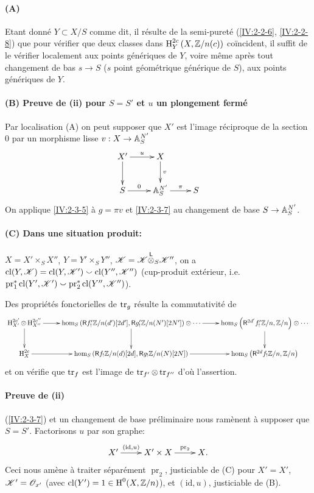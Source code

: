 
\paragraph{(A)}
Etant donné $Y\subset X/S$ comme dit, il résulte de la semi-pureté 
(\ref{IV:2-2-6}, \ref{IV:2-2-8}) que pour vérifier que deux classes dans 
$\operatorname{H}_Y^{2 c}\left(X,\mathbb{Z}/n(c)\right)$ coïncident, il suffit de le vérifier 
localement aux points génériques de $Y$, voire même après tout 
changement de bas $s\to S$ ($s$ point géométrique générique de $S$), 
aux points génériques de $Y$. 

\paragraph{(B) Preuve de (ii) pour $S=S'$ et $u$ un plongement fermé}
Par localisation (A) on peut supposer que $X'$ est l'image 
réciproque de la section $0$ par un morphisme lisse $v:X\to \mathbb{A}_S^{N'}$ 
\[\xymatrix{
  X' \ar[r]^-u \ar[d] 
    & X \ar[d]^-v \\
  S \ar[r]^-0 
    & \dA_S^{N'} \ar[r]^-\pi 
    & S
}\]
On applique \ref{IV:2-3-5} à $g=\pi v$ et \ref{IV:2-3-7} au changement de 
base $S\to \mathbb{A}_S^{N'}$. 

\paragraph{(C) Dans une situation produit:}
$X=X'\times_S X''$, $Y=Y'\times_S Y''$, $\mathscr{K}=\mathscr{K}{\overset{\mathsf{L}}{\otimes}}_S \mathscr{K}''$, on a 
$\operatorname{cl}(Y,\mathscr{K}) = \operatorname{cl}(Y,\mathscr{K}')\smallsmile \operatorname{cl}(Y'',\mathscr{K}'')$ (cup-produit extérieur, 
i.e. $\operatorname{pr}_1^\ast \operatorname{cl}(Y',\mathscr{K}')\smallsmile \operatorname{pr}_2^\ast \operatorname{cl}(Y'',\mathscr{K}'')$). 

Des propriétés fonctorielles de $\operatorname{tr}_g$ \cite[XVIII.2.12]{sga4} résulte 
la commutativité de 
\[\xymatrix{
  \h_{X'}^{2c'}\otimes \h_{X''}^{2 c''}\ar[r] \ar[d] 
    & \hom_S\left(\R f_!' \dZ/n(d')[2 d'],\R g_!'\dZ/n(N')[2 N']\right)\otimes \cdots \ar[r] \ar[d] 
    & \hom_S\left(\R^{2 d'} f_!' \dZ/n,\dZ/n\right) \otimes \cdots \ar[d] \\
  \h_X^{2 c} \ar[r] 
    & \hom_S\left(\R f_!\dZ/n(d)[2 d],\R g_!\dZ/n(N)[2 N]\right) \ar[r] 
    & \hom_S\left(\R ^{2 d}f_!\dZ/n,\dZ/n\right)
}\]
et on vérifie que $\operatorname{tr}_f$ est l'image de $\operatorname{tr}_{f'}\otimes \operatorname{tr}_{f''}$ d'où 
l'assertion. 

\paragraph{Preuve de (ii)}
(\ref{IV:2-3-7}) et un changement de base préliminaire nous ramènent à 
supposer que $S=S'$. Factorisons $u$ par son graphe:
\[\xymatrix{
  X' \ar[r]^-{(\text{id},u)} 
    & X'\times X \ar[r]^-{\operatorname{pr}_2} 
    & X \text{.}
}\]
Ceci nous amène à traiter séparément $\operatorname{pr}_2$, justiciable 
de (C) pour $X'=X'$, $\mathscr{K}'=\mathscr{O}_{x'}$ (avec $\operatorname{cl}(Y')=1\in \operatorname{H}^0(X,\mathbb{Z}/n)$), et 
$(\text{id},u)$, justiciable de (B). 


